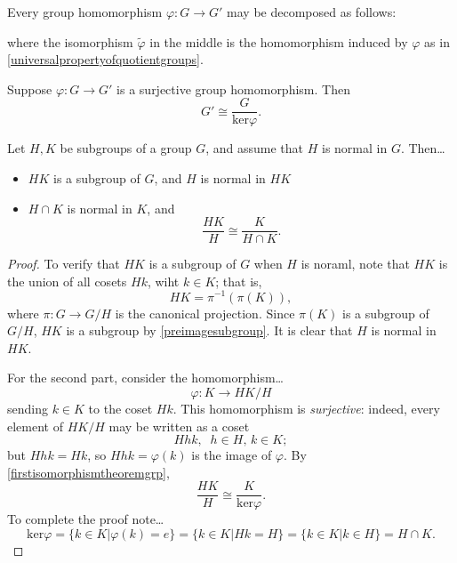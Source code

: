 \begin{theorem}
\label{grpcanonicaldecomposition}
Every group homomorphism $\varphi : G \rightarrow G'$ may be decomposed as follows:

\begin{figure}[H]
  \centering
  
\end{figure}

\noindent where the isomorphism $\tilde \varphi$ in the middle is the homomorphism induced by $\varphi$ as in \ref{universalpropertyofquotientgroups}.
\end{theorem}

\begin{corollary}
\label{firstisomorphismtheoremgrp}
Suppose $\varphi : G \rightarrow G'$ is a surjective group homomorphism. Then
$$G' \cong \frac{G}{\textrm{ker}\varphi}.$$
\end{corollary}

\begin{theorem}
\label{secondisomorphismtheoremgrp}
Let $H,K$ be subgroups of a group $G$, and assume that $H$ is normal in $G$. Then\dots
\begin{itemize}
  \item $HK$ is a subgroup of $G$, and $H$ is normal in $HK$
  \item $H \cap K$ is normal in $K$, and
  			$$\frac{HK}{H} \cong \frac{K}{H \cap K}.$$
\end{itemize}
\end{theorem}

\begin{proof}
To verify that $HK$ is a subgroup of $G$ when $H$ is noraml, note that $HK$ is the union of all cosets $Hk$, wiht $k \in K$; that is,
$$HK = \pi^{-1}(\pi(K)),$$
where $\pi : G \rightarrow G/H$ is the canonical projection. Since $\pi(K)$ is a subgroup of $G/H$, $HK$ is a subgroup by \ref{preimagesubgroup}. It is clear that $H$ is normal in $HK$.

For the second part, consider the homomorphism\dots
$$\varphi : K \rightarrow HK/H$$
sending $k\in K$ to the coset $Hk$. This homomorphism is \emph{surjective}: indeed, every element of $HK/H$ may be written as a coset
$$Hhk, \; \; h \in H, \, k\in K;$$
but $Hhk = Hk$, so $Hhk = \varphi(k)$ is the image of $\varphi$. By \ref{firstisomorphismtheoremgrp},
$$\frac{HK}{H} \cong \frac{K}{\textrm{ker}\varphi}.$$
To complete the proof note\dots
$$\textrm{ker}\varphi = \{ k \in K | \varphi(k) = e \} = \{ k \in K | Hk = H \} = \{ k \in K | k \in H \} = H \cap K.$$
\end{proof}

